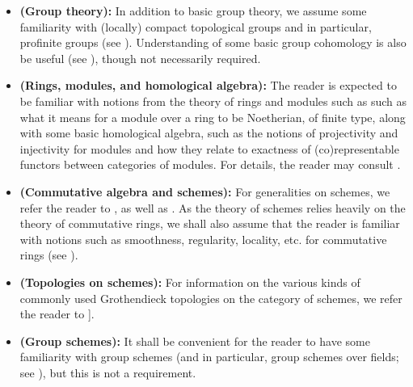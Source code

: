         \begin{convention} \label{conv: algebraic_geometry}
            \noindent
            \begin{itemize}
                \item \textbf{(Group theory):} In addition to basic group theory, we assume some familiarity with (locally) compact topological groups and in particular, profinite groups (see \cite[Section I.1]{neukirch_1999_cohomology_of_number_field}). Understanding of some basic group cohomology is also be useful (see \cite[Chapter VI]{hilton_stammbach_homological_algebra}), though not necessarily required.
                \item \textbf{(Rings, modules, and homological algebra):} The reader is expected to be familiar with notions from the theory of rings and modules such as such as what it means for a module over a ring to be Noetherian, of finite type, along with some basic homological algebra, such as the notions of projectivity and injectivity for modules and how they relate to exactness of (co)representable functors between categories of modules. For details, the reader may consult \cite{chapter0}.
                \item \textbf{(Commutative algebra and schemes):} For generalities on schemes, we refer the reader to \cite[Chapters II and III]{hartshorne}, as well as \cite[\href{https://stacks.math.columbia.edu/tag/01H8}{Tag 01H8}, \href{https://stacks.math.columbia.edu/tag/01QL}{Tag 01QL}, and \href{https://stacks.math.columbia.edu/tag/0209}{Tag 0209}]{stacks}. As the theory of schemes relies heavily on the theory of commutative rings, we shall also assume that the reader is familiar with notions such as smoothness, regularity, locality, etc. for commutative rings (see \cite[\href{https://stacks.math.columbia.edu/tag/00AO}{Tag 00AO}]{stacks}).
                \item \textbf{(Topologies on schemes):} For information on the various kinds of commonly used Grothendieck topologies on the category of schemes, we refer the reader to \cite[\href{https://stacks.math.columbia.edu/tag/020K}{Tag 020K} and \href{https://stacks.math.columbia.edu/tag/0238}{Tag 0238}]{stacks}].
                \item \textbf{(Group schemes):} It shall be convenient for the reader to have some familiarity with group schemes (and in particular, group schemes over fields; see \cite[\href{https://stacks.math.columbia.edu/tag/047J}{Tag 047J} and \href{https://stacks.math.columbia.edu/tag/0BF6}{Tag 0BF6}]{stacks}), but this is not a requirement.
            \end{itemize}
        \end{convention}
        
